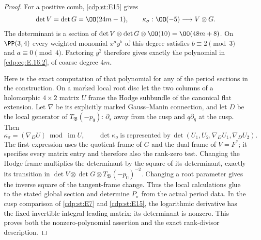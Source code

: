 \begin{proof}
For a positive comb, \ref{cdp:st:E15} gives
\[
 \det V=\det G=\OO(24m-1),\qquad
 \kappa_\sigma:\OO(-5)\longrightarrow V\otimes G.
\]
The determinant is a section of $\det V\otimes\det G\otimes\OO(10)=\OO(48m+8)$. On $\PP(3,4)$ every weighted monomial $x^ay^b$ of this degree satisfies $b\equiv2\pmod3$ and $a\equiv0\pmod4$. Factoring $y^2$ therefore gives exactly the polynomial in \eqref{cdp:eq:E.16.2}, of coarse degree $4m$.

Here is the exact computation of that polynomial for any of the period sections in the construction. On a marked local root disc let the two columns of a holomorphic $4\times2$ matrix $U$ frame the Hodge subbundle of the canonical flat extension. Let $\nabla$ be its explicitly marked Gauss--Manin connection, and let $D$ be the local generator of $T_{\mathfrak B}(-p_0)$: $\partial_s$ away from the cusp and $q\partial_q$ at the cusp. Then
\[
 \kappa_\sigma=(\nabla_DU)\bmod\operatorname{im}U,
 \qquad
 \det\kappa_\sigma\ \text{is represented by}\
 \det(U_1,U_2,\nabla_DU_1,\nabla_DU_2).              \tag{E.16.3}\label{cdp:eq:E.16.3}
\]
The first expression uses the quotient frame of $G$ and the dual frame of $V=F^*$; it specifies every matrix entry and therefore also the rank-zero test. Changing the Hodge frame multiplies the determinant by the square of its determinant, exactly its transition in $\det V\otimes\det G\otimes T_{\mathfrak B}(-p_0)^{-2}$. Changing a root parameter gives the inverse square of the tangent-frame change. Thus the local calculations glue to the stated global section and determine $P_\sigma$ from the actual period data. In the cusp comparison of \ref{cdp:st:E7} and \ref{cdp:st:E15}, the logarithmic derivative has the fixed invertible integral leading matrix; its determinant is nonzero. This proves both the nonzero-polynomial assertion and the exact rank-divisor description.
\end{proof}


